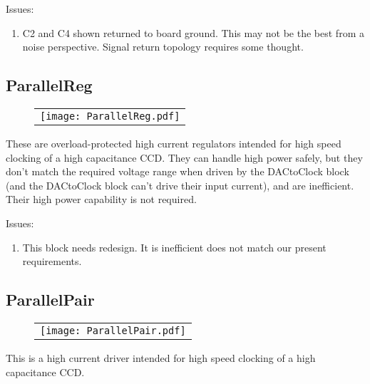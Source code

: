 \documentclass[a4paper,12pt]{article}
\begin{document}
Issues:
\begin{enumerate}
\item
C2 and C4 shown returned to board ground. This may not be the best from a noise perspective. Signal return topology requires some thought.
\end{enumerate}


\subsection{ParallelReg}
   \begin{figure}
   \begin{center}
   \begin{tabular}{c}
   \texttt{[image: ParallelReg.pdf]}
   \end{tabular}
   \end{center}
   \end{figure}

These are overload-protected high current regulators intended for high speed clocking of a high capacitance CCD. They can handle high power safely, but they don't match the required voltage range when driven by the DACtoClock block (and the DACtoClock block can't drive their input current), and are inefficient. Their high power capability is not required.

Issues:
\begin{enumerate}
\item
This block needs redesign. It is inefficient does not match our present requirements.
\end{enumerate}



\subsection{ParallelPair}

   \begin{figure}
   \begin{center}
   \begin{tabular}{c}
   \texttt{[image: ParallelPair.pdf]}
   \end{tabular}
   \end{center}
   \end{figure}

This is a high current driver intended for high speed clocking of a high capacitance CCD. 
\end{document}
